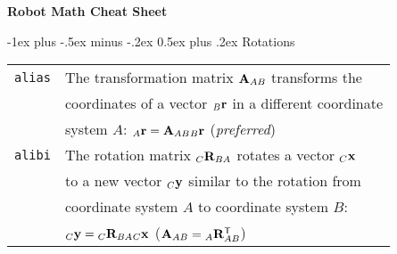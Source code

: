 \documentclass[10pt,landscape]{article}
\makeatletter
\renewcommand{\section}{\@startsection{section}{1}{0mm}%
                                {-1ex plus -.5ex minus -.2ex}%
                                {0.5ex plus .2ex}%
                                {\normalfont\large\bfseries}}
\makeatother
\begin{document}
\raggedright
\footnotesize
\begin{multicols}{2}


\setlength{\premulticols}{1pt}
\setlength{\postmulticols}{1pt}
\setlength{\multicolsep}{1pt}
\setlength{\columnsep}{2pt}

\begin{center}
     \Large{\textbf{Robot Math Cheat Sheet}} \\
\end{center}
\section{Rotations}
\begin{tabular}{@{}ll@{}}
\verb!alias!    & The transformation matrix $\mathbf A_{AB}$ transforms the\\ 
&  coordinates of a vector ${_{B}\mathbf r}$ in a different  coordinate\\
&   system $A$: ${_{A}\mathbf r} = \mathbf A_{AB} {_{B}\mathbf r}$ (\emph{preferred}) \\
\verb!alibi!   & The rotation matrix ${_C\mathbf R_{BA}}$ rotates a vector ${_C\mathbf x}$ \\ 
& to a new vector ${_C\mathbf y}$ similar to the rotation from \\
& coordinate system $A$ to  coordinate system $B$: \\
& ${_C\mathbf y} = {_C\mathbf R_{BA}} {_C\mathbf x}$ ($\mathbf A_{AB} = {_A\mathbf R^\mathsf{T}_{AB}}$)
\end{tabular}


\end{multicols}
\end{document}
